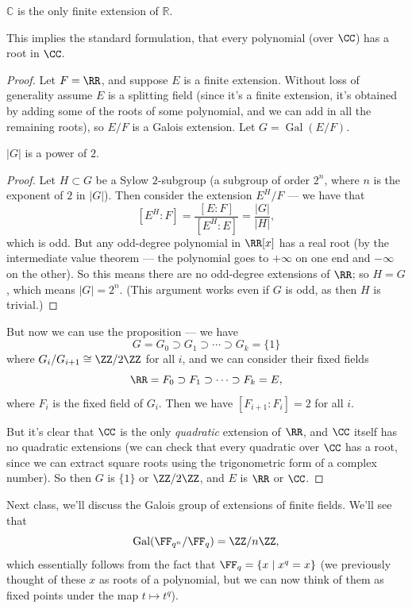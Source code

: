 \begin{theorem}
    $\mathbb{C}$ is the only finite extension of $\mathbb{R}$. 
\end{theorem}

This implies the standard formulation, that every polynomial (over $\CC$) has a root in $\CC$. 

\begin{proof}
    Let $F = \RR$, and suppose $E$ is a finite extension. Without loss of generality assume $E$ is a splitting field (since it's a finite extension, it's obtained by adding some of the roots of some polynomial, and we can add in all the remaining roots), so $E/F$ is a Galois extension. Let $G = \operatorname{Gal}(E/F)$. 
    
    \begin{lemma}
        $\lvert G \rvert$ is a power of $2$. 
    \end{lemma}
    
    \begin{proof}
        Let $H \subset G$ be a Sylow $2$-subgroup (a subgroup of order $2^n$, where $n$ is the exponent of $2$ in $\lvert G \rvert$). Then consider the extension $E^H/F$ --- we have that \[[E^H : F] = \frac{[E : F]}{[E^H : E]} = \frac{\lvert G \rvert}{\lvert H \rvert},\] which is odd. But any odd-degree polynomial in $\RR[x]$ has a real root (by the intermediate value theorem --- the polynomial goes to $+\infty$ on one end and $-\infty$ on the other). So this means there are no odd-degree extensions of $\RR$; so $H = G$, which means $\lvert G \rvert = 2^n$. (This argument works even if $G$ is odd, as then $H$ is trivial.)
    \end{proof}
    
    But now we can use the proposition --- we have \[G = G_0 \supset G_1 \supset \cdots \supset G_k = \{1\}\] where $G_i/G_{i + 1} \cong \ZZ/2\ZZ$ for all $i$, and we can consider their fixed fields \[\RR = F_0 \supset F_1 \supset \cdots \supset F_k = E,\] where $F_i$ is the fixed field of $G_i$. Then we have $[F_{i + 1} : F_i] = 2$ for all $i$. 
    
    But it's clear that $\CC$ is the only \emph{quadratic} extension of $\RR$, and $\CC$ itself has no quadratic extensions (we can check that every quadratic over $\CC$ has a root, since we can extract square roots using the trigonometric form of a complex number). So then $G$ is $\{1\}$ or $\ZZ/2\ZZ$, and $E$ is $\RR$ or $\CC$. 
\end{proof}

Next class, we'll discuss the Galois group of extensions of finite fields. We'll see that \[\operatorname{Gal}(\FF_{q^n}/\FF_q) = \ZZ/n\ZZ,\] which essentially follows from the fact that $\FF_q = \{x \mid x^q = x\}$ (we previously thought of these $x$ as roots of a polynomial, but we can now think of them as fixed points under the map $t \mapsto t^q$). 


